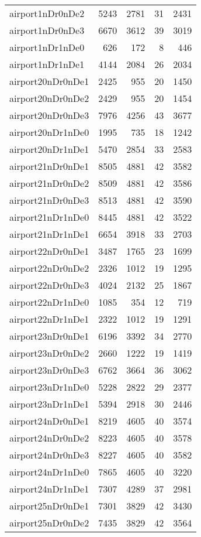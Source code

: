 \documentclass[../../../thesis.tex]{subfiles}
\begin{document}
\begin{longtable}{lrrrr}
airport1nDr0nDe2 & 5243 & 2781 & 31 & 2431 \\
airport1nDr0nDe3 & 6670 & 3612 & 39 & 3019 \\
airport1nDr1nDe0 & 626 & 172 & 8 & 446 \\
airport1nDr1nDe1 & 4144 & 2084 & 26 & 2034 \\
airport20nDr0nDe1 & 2425 & 955 & 20 & 1450 \\
airport20nDr0nDe2 & 2429 & 955 & 20 & 1454 \\
airport20nDr0nDe3 & 7976 & 4256 & 43 & 3677 \\
airport20nDr1nDe0 & 1995 & 735 & 18 & 1242 \\
airport20nDr1nDe1 & 5470 & 2854 & 33 & 2583 \\
airport21nDr0nDe1 & 8505 & 4881 & 42 & 3582 \\
airport21nDr0nDe2 & 8509 & 4881 & 42 & 3586 \\
airport21nDr0nDe3 & 8513 & 4881 & 42 & 3590 \\
airport21nDr1nDe0 & 8445 & 4881 & 42 & 3522 \\
airport21nDr1nDe1 & 6654 & 3918 & 33 & 2703 \\
airport22nDr0nDe1 & 3487 & 1765 & 23 & 1699 \\
airport22nDr0nDe2 & 2326 & 1012 & 19 & 1295 \\
airport22nDr0nDe3 & 4024 & 2132 & 25 & 1867 \\
airport22nDr1nDe0 & 1085 & 354 & 12 & 719 \\
airport22nDr1nDe1 & 2322 & 1012 & 19 & 1291 \\
airport23nDr0nDe1 & 6196 & 3392 & 34 & 2770 \\
airport23nDr0nDe2 & 2660 & 1222 & 19 & 1419 \\
airport23nDr0nDe3 & 6762 & 3664 & 36 & 3062 \\
airport23nDr1nDe0 & 5228 & 2822 & 29 & 2377 \\
airport23nDr1nDe1 & 5394 & 2918 & 30 & 2446 \\
airport24nDr0nDe1 & 8219 & 4605 & 40 & 3574 \\
airport24nDr0nDe2 & 8223 & 4605 & 40 & 3578 \\
airport24nDr0nDe3 & 8227 & 4605 & 40 & 3582 \\
airport24nDr1nDe0 & 7865 & 4605 & 40 & 3220 \\
airport24nDr1nDe1 & 7307 & 4289 & 37 & 2981 \\
airport25nDr0nDe1 & 7301 & 3829 & 42 & 3430 \\
airport25nDr0nDe2 & 7435 & 3829 & 42 & 3564 \\

\end{longtable}
\end{document}
